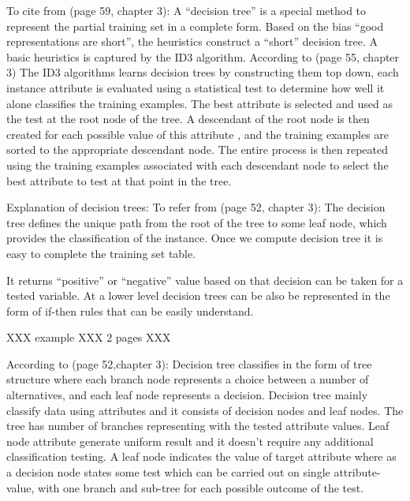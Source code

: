\documentclass{report}
\begin{document}
To cite from \cite{Mitchell1997MachineLearning}(page 59, chapter 3): A ``decision tree'' is a special method to represent the partial training set in a complete form. Based on the bias ``good representations are short'', the heuristics construct a ``short'' decision tree. A basic heuristics is captured by the ID3 algorithm. According to \cite{Mitchell1997MachineLearning}(page 55, chapter 3) The ID3 algorithms learns decision trees by constructing them top down, each instance attribute is evaluated using a statistical test to determine how well it alone classifies the training examples. The best attribute is selected and used as the test at the root node of the tree. A descendant of the root node is then created for each possible value of this attribute , and the training examples are sorted to the appropriate descendant node. The entire process is then repeated using the training examples associated with each descendant node to select the best attribute to test at that point in the tree. 

Explanation of decision trees: To refer from \cite{Mitchell1997MachineLearning}(page 52, chapter 3): The decision tree defines the unique path from the root of the tree to some leaf node, which provides the classification of the instance. Once we compute decision tree it is easy to complete the training set table. 

It returns ``positive'' or ``negative'' value based on that decision can be taken for a tested variable. At a lower level decision trees can be also be represented in the form of if-then rules that can be easily understand.

XXX example XXX 2 pages XXX

According to \cite{Mitchell1997MachineLearning}(page 52,chapter 3): Decision tree classifies in the form of tree structure where each branch node represents a choice between a number of alternatives, and each leaf node represents a decision. Decision tree mainly classify data using attributes and it consists of decision nodes and leaf nodes. The tree has number of branches representing with the tested attribute values. Leaf node attribute generate uniform result and it doesn't require any additional classification testing. A leaf node indicates the value of target attribute where as a decision node states some test which can be carried out on single attribute-value, with one branch and sub-tree for each possible outcome of the test.
\end{document}
